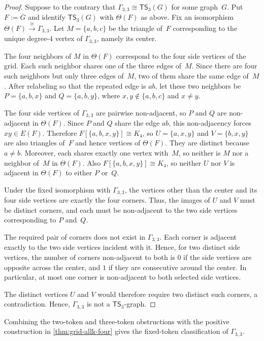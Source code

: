 \documentclass[a4paper]{article}
\theoremstyle{plain}
\theoremstyle{definition}
\newcommand{\TSsym}{\mathsf{TS}}
\numberwithin{equation}{section}
\begin{document}
\begin{proof}
Suppose to the contrary that $\Gamma_{3,3}\cong\TSsym_3(G)$ for some graph~$G$.
Put $F:=\overline G$ and identify $\TSsym_3(G)$ with $\Theta(F)$ as above.
Fix an isomorphism $\Theta(F)\xrightarrow{\cong}\Gamma_{3,3}$.
Let $M=\{a,b,c\}$ be the triangle of~$F$ corresponding to the unique degree-$4$ vertex of $\Gamma_{3,3}$, namely its center.

The four neighbors of $M$ in $\Theta(F)$ correspond to the four side vertices of the grid.
Each such neighbor shares one of the three edges of~$M$.
Since there are four such neighbors but only three edges of~$M$, two of them share the same edge of~$M$.
After relabeling so that the repeated edge is $ab$, let these two neighbors be
$P=\{a,b,x\}$ and $Q=\{a,b,y\}$,
where $x,y\notin\{a,b,c\}$ and $x\ne y$.

The four side vertices of $\Gamma_{3,3}$ are pairwise non-adjacent, so $P$ and $Q$ are non-adjacent in $\Theta(F)$.
Since $P$ and $Q$ share the edge $ab$, this non-adjacency forces $xy\in E(F)$.
Therefore $F[\{a,b,x,y\}]\cong K_4$, so $U=\{a,x,y\}$ and $V=\{b,x,y\}$ are also triangles of~$F$ and hence vertices of $\Theta(F)$.
They are distinct because $a\ne b$.
Moreover, each shares exactly one vertex with~$M$, so neither is $M$ nor a neighbor of~$M$ in $\Theta(F)$.
Also $F[\{a,b,x,y\}]\cong K_4$, so neither $U$ nor $V$ is adjacent in $\Theta(F)$ to either $P$ or~$Q$.

Under the fixed isomorphism with $\Gamma_{3,3}$, the vertices other than the center and its four side vertices are exactly the four corners.
Thus, the images of $U$ and $V$ must be distinct corners, and each must be non-adjacent to the two side vertices corresponding to $P$ and~$Q$.

The required pair of corners does not exist in $\Gamma_{3,3}$.
Each corner is adjacent exactly to the two side vertices incident with it.
Hence, for two distinct side vertices, the number of corners non-adjacent to both is $0$ if the side vertices are opposite across the center, and $1$ if they are consecutive around the center.
In particular, at most one corner is non-adjacent to both selected side vertices.

The distinct vertices $U$ and $V$ would therefore require two distinct such corners, a contradiction.
Hence, $\Gamma_{3,3}$ is not a $\TSsym_3$-graph.
\end{proof}

Combining the two-token and three-token obstructions with the positive construction in \cref{thm:grid-allk-four} gives the fixed-token classification of $\Gamma_{3,3}$.
\end{document}
